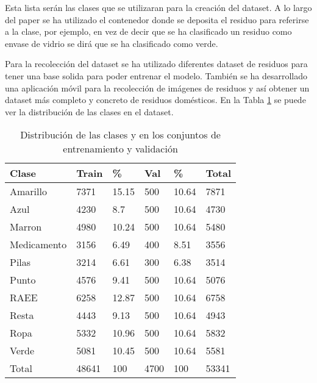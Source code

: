 \documentclass[10pt,a4paper,twocolumn,twoside]{article}
\begin{document}
Esta lista serán las clases que se utilizaran para la creación del dataset. A lo largo del paper se ha utilizado
el contenedor donde se deposita el residuo para referirse a la clase, por ejemplo, en vez de decir que se ha
clasificado un residuo como envase de vidrio se dirá que se ha clasificado como verde.

Para la recolección del dataset se ha utilizado diferentes dataset de residuos para tener una base solida para poder
entrenar el modelo. También se ha desarrollado una aplicación móvil para la recolección de imágenes de residuos
y así obtener un dataset más completo y concreto de residuos domésticos. En la Tabla \ref{tab:dist_clases} se puede ver
la distribución de las clases en el dataset.

\begin{table}[h]
  \centering
  \begin{tabular}{l|ll|ll|l}
  \toprule
  Clase & Train & \%  & Val & \%  & Total \\ 
  \midrule
  Amarillo       & 7371           & 15.15        & 500          & 10.64        & 7871           \\
  Azul           & 4230           & 8.7          & 500          & 10.64        & 4730           \\
  Marron         & 4980           & 10.24        & 500          & 10.64        & 5480           \\
  Medicamento    & 3156           & 6.49         & 400          & 8.51         & 3556           \\
  Pilas          & 3214           & 6.61         & 300          & 6.38         & 3514           \\
  Punto          & 4576           & 9.41         & 500          & 10.64        & 5076           \\
  RAEE           & 6258           & 12.87        & 500          & 10.64        & 6758           \\
  Resta          & 4443           & 9.13         & 500          & 10.64        & 4943           \\
  Ropa           & 5332           & 10.96        & 500          & 10.64        & 5832           \\
  Verde          & 5081           & 10.45        & 500          & 10.64        & 5581           \\
  \midrule
  Total & 48641 & 100 & 4700 & 100 & 53341 \\
  \bottomrule
  \end{tabular}
  \caption{Distribución de las clases y en los conjuntos de entrenamiento y validación}
  \label{tab:dist_clases}
\end{table}
\end{document}
